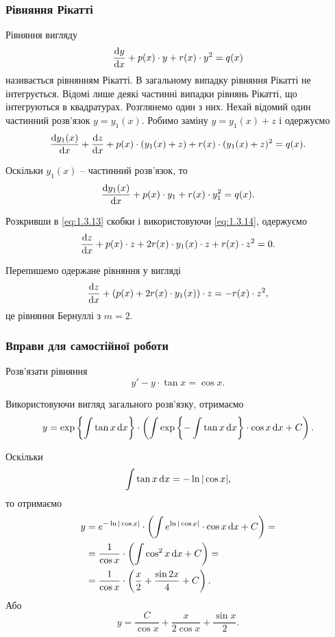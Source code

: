 \subsubsection{Рівняння Рікатті}

Рівняння вигляду 
\begin{equation}
	\label{eq:1.3.12}
	\frac{\mathop{}\!\mathrm{d} y}{\mathop{}\!\mathrm{d} x} + p(x) \cdot y + r(x) \cdot y^2 = q(x)
\end{equation} 
називається рівнянням Рікатті. В загальному випадку рівняння Рікатті не інтегрується. Відомі лише деякі частинні випадки рівнянь Рікатті, що інтегруються в квадратурах. Розглянемо один з них. Нехай відомий один частинний розв’язок $y = y_1(x)$. Робимо заміну $y = y_1(x) + z$ і одержуємо
\begin{equation}
	\label{eq:1.3.13}
	\frac{\mathop{}\!\mathrm{d} y_1(x)}{\mathop{}\!\mathrm{d} x} + \frac{\mathop{}\!\mathrm{d} z}{\mathop{}\!\mathrm{d} x} + p(x) \cdot (y_1(x) + z) + r(x) \cdot (y_1(x) + z)^2 = q(x).
\end{equation}

Оскільки $y_1(x)$ -- частинний розв’язок, то
\begin{equation}
	\label{eq:1.3.14}
	\frac{\mathop{}\!\mathrm{d} y_1(x)}{\mathop{}\!\mathrm{d} x} + p(x) \cdot y_1 + r(x) \cdot y_1^2 = q(x).
\end{equation}

Розкривши в \eqref{eq:1.3.13} скобки і використовуючи \eqref{eq:1.3.14}, одержуємо
\begin{equation}
	\label{eq:1.3.15}
	\frac{\mathop{}\!\mathrm{d} z}{\mathop{}\!\mathrm{d} x} + p(x) \cdot z + 2 r(x) \cdot y_1(x) \cdot z + r(x) \cdot z^2 = 0.
\end{equation}

Перепишемо одержане рівняння у вигляді
\begin{equation}
	\label{eq:1.3.16}
	\frac{\mathop{}\!\mathrm{d} z}{\mathop{}\!\mathrm{d} x} + \left(p(x) + 2 r(x) \cdot y_1(x)\right) \cdot z = - r(x) \cdot z^2 ,
\end{equation}
це рівняння Бернуллі з $m = 2$.

\subsubsection{Вправи для самостійної роботи}

\begin{example}
	Розв’язати рівняння \[ y' - y \cdot \tan x = \cos x.\]
\end{example}
\begin{solution}
	Використовуючи вигляд загального розв’язку, отримаємо
	\[ y = \exp\left\{\int \tan x \mathop{}\!\mathrm{d} x\right\} \cdot \left(\int \exp\left\{-\int\tan x\mathop{}\!\mathrm{d} x\right\}\cdot \cos x \mathop{}\!\mathrm{d} x+C\right). \]

	Оскільки \[\int \tan x \mathop{}\!\mathrm{d} x = - \ln |\cos x|,\] то отримаємо
	\begin{align*}
		y &= e^{-\ln|\cos x|} \cdot \left(\int e^{\ln|\cos x|} \cdot \cos x \mathop{}\!\mathrm{d} x+C\right) = \\
		&= \frac{1}{\cos x} \cdot \left( \int \cos^2 x \mathop{}\!\mathrm{d} x + C \right) = \\
		&= \frac{1}{\cos x} \cdot \left( \frac x2 + \frac{\sin 2x}{4} + C \right).
	\end{align*}
	Або
	\[ y = \frac{C}{\cos x} + \frac{x}{2 \cos x} + \frac{\sin x}{2}. \]
\end{solution}

